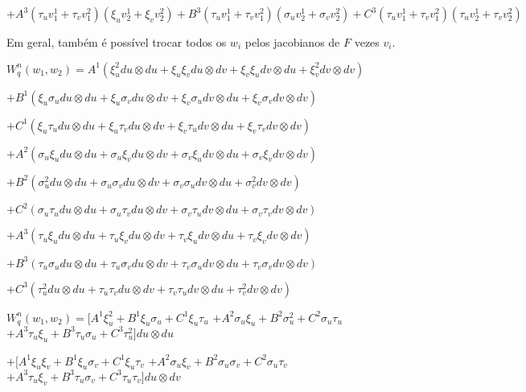\documentclass[10pt,a4paper]{article}
\begin{document}
		$+ A^3 (\tau_u v^1_1 + \tau_v v^2_1) (\xi_u v^1_2 + \xi_v v^2_2) + B^3 (\tau_u v^1_1 + \tau_v v^2_1) (\sigma_u v^1_2 + \sigma_v v^2_2) + C^3 (\tau_u v^1_1 + \tau_v v^2_1) (\tau_u v^1_2 + \tau_v v^2_2) $

		\vspace{3mm}

		Em geral, tamb\'em \'e poss\'ivel trocar todos os $w_i$ pelos jacobianos de $F$ vezes $v_i$.

		\vspace{3mm}

		$W_q^n(w_1, w_2) = A^1 (\xi_u^2 du \otimes du + \xi_u \xi_v du \otimes dv + \xi_v \xi_u dv \otimes du + \xi_v^2 dv \otimes dv)$

		$+ B^1 (\xi_u \sigma_u du \otimes du + \xi_u \sigma_v du \otimes dv + \xi_v \sigma_u dv \otimes du + \xi_v \sigma_v dv \otimes dv)$

		$+ C^1 (\xi_u \tau_u du \otimes du + \xi_u \tau_v du \otimes dv + \xi_v \tau_u dv \otimes du + \xi_v \tau_v dv \otimes dv)$

		$+ A^2 (\sigma_u \xi_u du \otimes du + \sigma_u \xi_v du \otimes dv + \sigma_v \xi_u dv \otimes du + \sigma_v \xi_v dv \otimes dv)$

		$+ B^2 (\sigma_u^2 du \otimes du + \sigma_u \sigma_v du \otimes dv + \sigma_v \sigma_u dv \otimes du + \sigma_v^2 dv \otimes dv)$

		$+ C^2 (\sigma_u \tau_u du \otimes du + \sigma_u \tau_v du \otimes dv + \sigma_v \tau_u dv \otimes du + \sigma_v \tau_v dv \otimes dv)$

		$+ A^3 (\tau_u \xi_u du \otimes du + \tau_u \xi_v du \otimes dv + \tau_v \xi_u dv \otimes du + \tau_v \xi_v dv \otimes dv)$

		$+ B^3 (\tau_u \sigma_u du \otimes du + \tau_u \sigma_v du \otimes dv + \tau_v \sigma_u dv \otimes du + \tau_v \sigma_v dv \otimes dv)$

		$+ C^3 (\tau_u^2 du \otimes du + \tau_u \tau_v du \otimes dv + \tau_v \tau_u dv \otimes du + \tau_v^2 dv \otimes dv)$

		\vspace{3mm}

		$W_q^n(w_1, w_2) = [A^1 \xi_u^2  + B^1 \xi_u \sigma_u  + C^1 \xi_u \tau_u$
		$+ A^2 \sigma_u \xi_u  + B^2 \sigma_u^2  + C^2 \sigma_u \tau_u$
		$+ A^3 \tau_u \xi_u  + B^3 \tau_u \sigma_u  + C^3 \tau_u^2] du \otimes du$

		$+ [A^1 \xi_u \xi_v  + B^1 \xi_u \sigma_v  + C^1 \xi_u \tau_v$
		$+ A^2 \sigma_u \xi_v  + B^2 \sigma_u \sigma_v  + C^2 \sigma_u \tau_v$
		$+ A^3 \tau_u \xi_v  + B^3 \tau_u \sigma_v  + C^3 \tau_u \tau_v] du \otimes dv$
\end{document}
